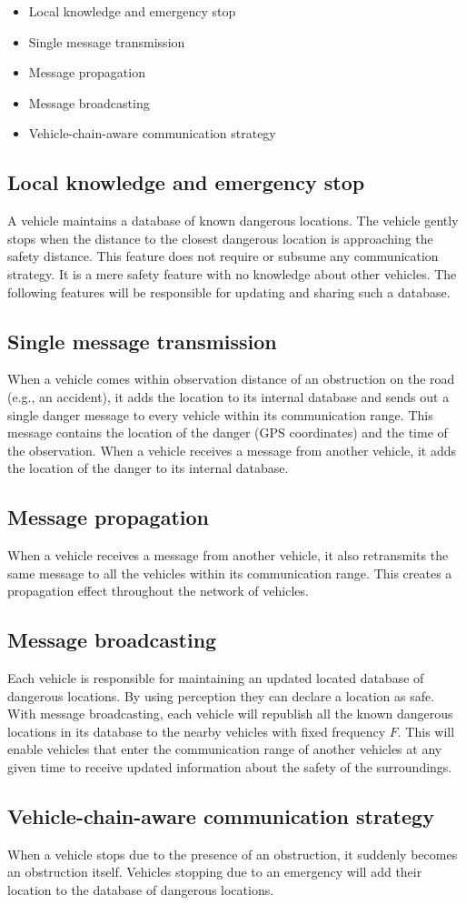 \begin{itemize}
\item Local knowledge and emergency stop
\item Single message transmission
\item Message propagation
\item Message broadcasting
\item Vehicle-chain-aware communication strategy
\end{itemize}

\subsection{Local knowledge and emergency stop}
A vehicle maintains a database of known dangerous locations. The vehicle gently stops when the distance to the closest
dangerous location is approaching the safety distance. This feature does not require or subsume any communication
strategy. It is a mere safety feature with no knowledge about other vehicles. The following features will be responsible 
for updating and sharing such a database.

\subsection{Single message transmission}
When a vehicle comes within observation distance of an obstruction on the road (e.g., an accident), 
it adds the location to its internal database and sends out a single danger message to every vehicle within its 
communication range. This message contains the location of the danger (GPS coordinates) and the time of the observation.
When a vehicle receives a message from another vehicle, it adds the location of the danger to its internal database.

\subsection{Message propagation}
When a vehicle receives a message from another vehicle, it also retransmits the same message to all the vehicles within
its communication range. This creates a propagation effect throughout the network of vehicles.

\subsection{Message broadcasting}
Each vehicle is responsible for maintaining an updated located database of dangerous locations. By using perception
they can declare a location as safe. With message broadcasting, each vehicle will republish all the known dangerous
locations in its database to the nearby vehicles with fixed frequency $F$. This will enable vehicles that enter the
communication range of another vehicles at any given time to receive updated information about the safety of the surroundings.

\subsection{Vehicle-chain-aware communication strategy}
When a vehicle stops due to the presence of an obstruction, it suddenly becomes an obstruction itself.
Vehicles stopping due to an emergency will add their location to the database of dangerous locations.